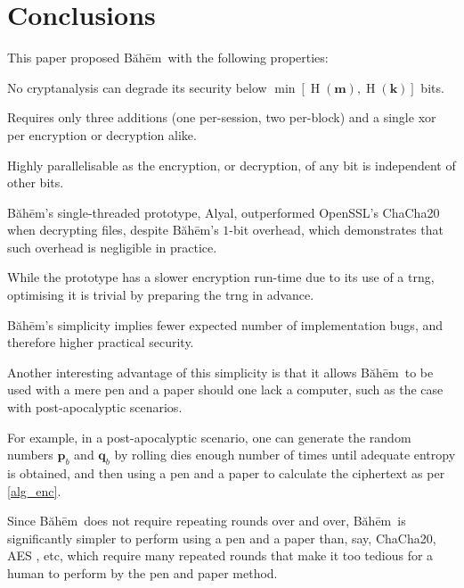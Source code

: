 \documentclass[twocolumn,hidelinks]{article}
\newcommand{\baheem}{Băhēm}
\newcommand{\alyal}{Alyal}
\DeclareMathOperator{\entropy}{H}
\begin{document}
\section{Conclusions}
This paper proposed \baheem\ with the following properties:
\begin{description}[itemsep=0em]
    \item[Provably secure:] No cryptanalysis can degrade its
        security below $\min[\entropy(\mathbf{m}), \entropy(\mathbf{k})]$
        bits.

    \item[Fast:] Requires only three additions (one per-session, two
        per-block) and a single \gls{xor} per encryption or decryption
        alike.

        Highly parallelisable as the encryption, or decryption, of any bit
        is independent of other bits.

        \baheem's single-threaded prototype, \alyal, outperformed OpenSSL's
        ChaCha20 when decrypting files, despite \baheem's $1$-bit overhead,
        which demonstrates that such overhead is negligible in practice.

        While the prototype has a slower encryption run-time due to its use
        of a \gls{trng}, optimising it is trivial by preparing the
        \gls{trng} in advance.

    \item[Simple:] \baheem's simplicity implies fewer expected number of
        implementation bugs, and therefore higher practical security.

        Another interesting advantage of this simplicity is that it allows
        \baheem\ to be used with a mere pen and a paper should one lack a
        computer, such as the case with post-apocalyptic scenarios.

        For example, in a post-apocalyptic scenario, one can generate the
        random numbers $\mathbf{p}_b$ and $\mathbf{q}_b$ by rolling dies
        enough number of times until adequate entropy is obtained, and then
        using a pen and a paper to calculate the ciphertext as per
        \cref{alg_enc}.

        Since \baheem\ does not require repeating rounds over and over,
        \baheem\ is significantly simpler to perform using a pen and a
        paper than, say, ChaCha20, AES \cite{aes}, etc, which require many
        repeated rounds that make it too tedious for a human to perform by
        the pen and paper method.
\end{description}
\end{document}
